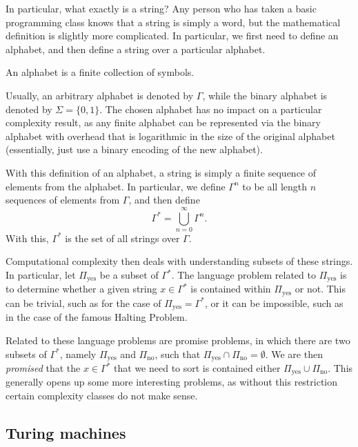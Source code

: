 \documentclass[../thesis-main/thesis-main]{subfiles}
\begin{document}
In particular, what exactly is a string?  Any person who has taken a basic programming class knows that a string is simply a word, but the mathematical definition is slightly more complicated.  In particular, we first need to define an alphabet, and then define a string over a particular alphabet.  
\begin{definition}[Alphabet] An alphabet is a finite collection of symbols.
\end{definition}
Usually, an arbitrary alphabet is denoted by $\Gamma$, while the binary alphabet is denoted by $\Sigma = \{0,1\}$.  The chosen alphabet has no impact on a particular complexity result, as any finite alphabet can be represented via the binary alphabet with overhead that is logarithmic in the size of the original alphabet (essentially, just use a binary encoding of the new alphabet).  

With this definition of an alphabet, a string is simply a finite sequence of elements from the alphabet.  In particular, we define $\Gamma^n$ to be all length $n$ sequences of elements from $\Gamma$, and then define
\begin{equation}
  \Gamma^* = \bigcup_{n=0}^\infty \Gamma^n.
\end{equation}
With this, $\Gamma^*$ is the set of all strings over $\Gamma$.

Computational complexity then deals with understanding subsets of these strings.  In particular, let $\Pi_{\text{yes}}$ be a subset of $\Gamma^*$.  The language problem related to $\Pi_{\text{yes}}$ is to determine whether a given string $x\in \Gamma^*$ is contained within $\Pi_{\text{yes}}$ or not.  This can be trivial, such as for the case of $\Pi_{\text{yes}} = \Gamma^*$, or it can be impossible, such as in the case of the famous Halting Problem. 

Related to these language problems are promise problems, in which there are two subsets of $\Gamma^*$, namely $\Pi_{\text{yes}}$ and $\Pi_{\text{no}}$, such that $\Pi_{\text{yes}} \cap \Pi_{\text{no}} = \emptyset$.  We are then \emph{promised} that the $x\in \Gamma^*$ that we need to sort is contained either $\Pi_{\text{yes}} \cup \Pi_{\text{no}}$.  This generally opens up some more interesting problems, as without this restriction certain complexity classes do not make sense.


\subsection{Turing machines}
\end{document}
